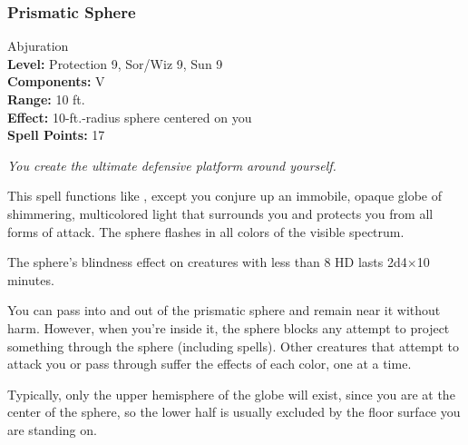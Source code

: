 % 
% 
% 
\subsubsection{Prismatic Sphere}
\label{Spell:PrismaticSphere}
Abjuration
\\ \textbf{Level:} Protection 9, Sor/Wiz 9, Sun 9
\\ \textbf{Components:} V
\\ \textbf{Range:} 10 ft.
\\ \textbf{Effect:} 10-ft.-radius sphere centered on you
\\ \textbf{Spell Points:} 17

\emph{You create the ultimate defensive platform around yourself.}

This spell functions like , except you conjure up an immobile, 
opaque globe of shimmering, multicolored light that surrounds you and protects you from all forms of attack. 
The sphere flashes in all colors of the visible spectrum.

The sphere's blindness effect on creatures with less than 8 HD lasts 2d4$\times$10 minutes.

You can pass into and out of the prismatic sphere and remain near it without harm. 
However, when you're inside it, the sphere blocks any attempt to project something through the sphere (including spells). 
Other creatures that attempt to attack you or pass through suffer the effects of each color, one at a time.

Typically, only the upper hemisphere of the globe will exist, 
since you are at the center of the sphere, so the lower half is usually excluded by the floor surface you are standing on.

